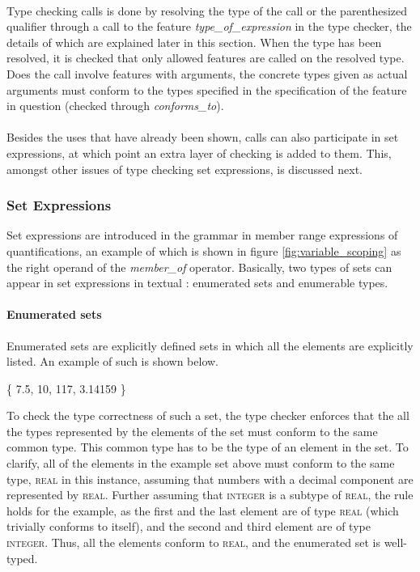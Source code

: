 \paragraph{}
Type checking calls is done by resolving the type of the call or the parenthesized qualifier through a call to the feature \textit{type\_of\_expression} in the type checker, the details of which are explained later in this section. When the type has been resolved, it is checked that only allowed features are called on the resolved type. Does the call involve features with arguments, the concrete types given as actual arguments must conform to the types specified in the specification of the feature in question (checked through \textit{conforms\_to}).
\paragraph{}
Besides the uses that have already been shown, calls can also participate in set expressions, at which point an extra layer of checking is added to them. This, amongst other issues of type checking set expressions, is discussed next.
\subsubsection{Set Expressions}
\label{implementation-set-expressions}
Set expressions are introduced in the grammar in member range expressions of quantifications, an example of which is shown in figure \ref{fig:variable_scoping} as the right operand of the \textit{member\_of} operator. Basically, two types of sets can appear in set expressions in textual \bon{}: enumerated sets and enumerable types.
\paragraph{Enumerated sets}
Enumerated sets are explicitly defined sets in which all the elements are explicitly listed. An example of such is shown below.
{\footnotesize
\begin{center}
\{ 7.5,  10, 117, 3.14159 \}	
\end{center}}
To check the type correctness of such a set, the type checker enforces that the all the types represented by the elements of the set must conform to the same common type. This common type has to be the type of an element in the set. To clarify, all of the elements in the example set above must conform to the same type, \textsc{real} in this instance, assuming that numbers with a decimal component are represented by \textsc{real}. Further assuming that \textsc{integer} is a subtype of \textsc{real}, the rule holds for the example, as the first and the last element are of type \textsc{real} (which trivially conforms to itself), and the second and third element are of type \textsc{integer}. Thus, all the elements conform to \textsc{real}, and the enumerated set is well-typed.

